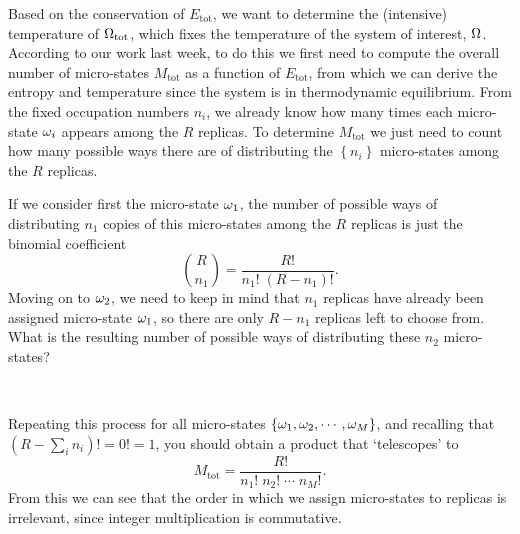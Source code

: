 Based on the conservation of $E_{\text{tot}}$, we want to determine the (intensive) temperature of $\Omega_{\text{tot}}$, which fixes the temperature of the system of interest, $\Omega$.
According to our work last week, to do this we first need to compute the overall number of micro-states $M_{\text{tot}}$ as a function of $E_{\text{tot}}$, from which we can derive the entropy and temperature since the system is in thermodynamic equilibrium.
From the fixed occupation numbers $n_i$, we already know how many times each micro-state $\omega_i$ appears among the $R$ replicas.
To determine $M_{\text{tot}}$ we just need to count how many possible ways there are of distributing the $\left\{n_i\right\}$ micro-states among the $R$ replicas.

If we consider first the micro-state $\omega_1$, the number of possible ways of distributing $n_1$ copies of this micro-states among the $R$ replicas is just the binomial coefficient
\begin{equation*}
  \binom{R}{n_1} = \frac{R!}{n_1! \; (R - n_1)!}.
\end{equation*}
Moving on to $\omega_2$, we need to keep in mind that $n_1$ replicas have already been assigned micro-state $\omega_1$, so there are only $R - n_1$ replicas left to choose from.
What is the resulting number of possible ways of distributing these $n_2$ micro-states?
\begin{mdframed}
  \ \\[50 pt]
\end{mdframed}
Repeating this process for all micro-states $\left\{\omega_1, \omega_2, \cdots, \omega_M\right\}$, and recalling that $\left(R - \sum_i n_i \right)! = 0! = 1$, you should obtain a product that `telescopes' to
\begin{equation}
  \label{eq:telescoped}
  M_{\text{tot}} = \frac{R!}{n_1! \; n_2! \; \cdots \; n_M!}.
\end{equation}
From this we can see that the order in which we assign micro-states to replicas is irrelevant, since integer multiplication is commutative.

